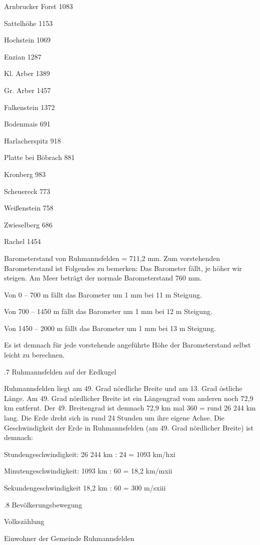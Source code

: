 Arnbrucker Forst    1083

Sattelhöhe  1153

Hochstein   1069

Enzian  1287

Kl. Arber   1389

Gr. Arber   1457

Falkenstein 1372

Bodenmais   691

Harlacherspitz  918

Platte bei Böbrach  881

Kronberg    983

Scheuereck  773

Weißenstein 758

Zwieselberg 686

Rachel  1454



Barometerstand von Ruhmannsfelden = 711,2 mm. Zum vorstehenden Barometerstand
ist Folgendes zu bemerken: Das Barometer fällt, je höher wir steigen. Am Meer
beträgt der normale Barometerstand 760 mm.

Von 0 – 700 m fällt das Barometer um 1 mm bei 11 m Steigung.

Von 700 – 1450 m fällt das Barometer um 1 mm bei 12 m Steigung.

Von 1450 – 2000 m fällt das Barometer um 1 mm bei 13 m Steigung.

Es ist demnach für jede vorstehende angeführte Höhe der Barometerstand selbst
leicht zu berechnen.

.7 Ruhmannsfelden auf der Erdkugel

Ruhmannsfelden liegt am 49. Grad nördliche Breite und am 13. Grad östliche
Länge. Am 49. Grad nördlicher Breite ist ein Längengrad vom anderen noch 72,9 km
entfernt. Der 49. Breitengrad ist demnach 72,9 km mal 360 = rund 26 244 km lang.
Die Erde dreht sich in rund 24 Stunden um ihre eigene Achse. Die Geschwindigkeit
der Erde in Ruhmannsfelden (am 49. Grad nördlicher Breite) ist demnach:

Stundengeschwindigkeit: 26 244 km : 24 = 1093 km/hxi

Minutengeschwindigkeit: 1093 km : 60 = 18,2 km/mxii

Sekundengeschwindigkeit 18,2 km : 60 = 300 m/sxiii

.8 Bevölkerungsbewegung

Volkszählung

Einwohner der Gemeinde Ruhmannsfelden



